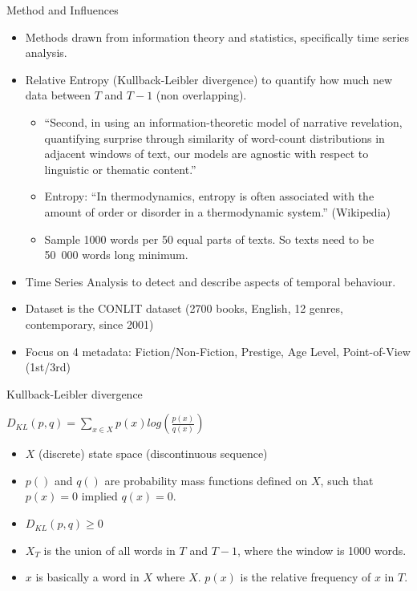\documentclass[aspectratio=169]{beamer}
\begin{document}
\begin{frame}{Method and Influences}
    \small
    \begin{itemize}
        \item Methods drawn from information theory and statistics, specifically time series analysis.
        \item Relative Entropy (Kullback-Leibler divergence) to quantify how much new data between $T$ and $T-1$ (non overlapping).
        \begin{itemize}
            \item ``Second, in using an information-theoretic model of narrative revelation, quantifying surprise through similarity of word-count distributions in adjacent windows of text, our models are agnostic with respect to linguistic or thematic content.''
            \item Entropy: ``In thermodynamics, entropy is often associated with the amount of order or disorder in a thermodynamic system.'' (Wikipedia)
            \item Sample 1000 words per 50 equal parts of texts. So texts need to be 50~000 words long minimum.
        \end{itemize}
        \item Time Series Analysis to detect and describe aspects of temporal behaviour.
        \item Dataset is the CONLIT dataset (2700 books, English, 12 genres, contemporary, since 2001)
        \item Focus on 4 metadata: Fiction/Non-Fiction, Prestige, Age Level, Point-of-View (1st/3rd)
    \end{itemize}
\end{frame}

\begin{frame}{Kullback-Leibler divergence}
    \begin{center}
        $D_{KL}(p, q) = \sum_{x \in X} p(x)log(\frac{p(x)}{q(x)})$
    \end{center}\pause %
    
    \begin{itemize}
        \item $X$ (discrete) state space (discontinuous sequence)
        \item $p()$ and $q()$ are probability mass functions defined on $X$, such that $p(x)=0$ implied $q(x)=0$.
        \item $D_{KL}(p, q) \geq 0$
        \item $X_{T}$ is the union of all words in $T$ and $T-1$, where the window is 1000 words.
        \item $x$ is basically a word in $X$ where $X$. $p(x)$ is the relative frequency of $x$ in $T$.
    \end{itemize}
\end{frame}
\end{document}
